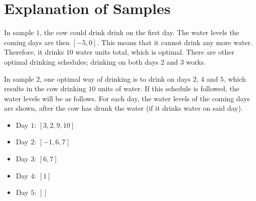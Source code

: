 \section*{Explanation of Samples}
In sample $1$, the cow could drink drink on the first day. The water levels the coming days are then
$[-5,0]$. This means that it cannot drink any more water. Therefore, it drinks $10$ water units total, which is optimal.
There are other optimal drinking schedules; drinking on both days $2$ and $3$ works.

In sample $2$, one optimal way of drinking is to drink on days $2$, $4$ and $5$, which results in the cow drinking $10$ units of water. 
If this schedule is followed, the water levels will be as follows. For each day, the water levels of the coming days are shown, after the cow has drunk the
water (if it drinks water on said day).
\begin{itemize}
  \item Day $1$: $[3,2,9,10]$
  \item Day $2$: $[-1,6,7]$
  \item Day $3$: $[6,7]$
  \item Day $4$: $[1]$
  \item Day $5$: $[]$
\end{itemize}
